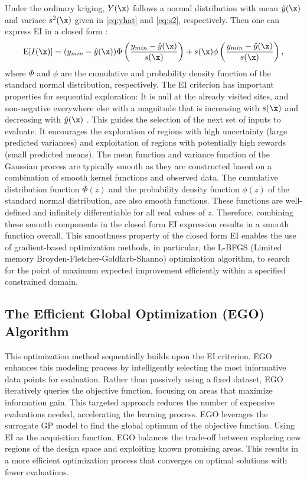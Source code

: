 \documentclass [PhD] {package/uclathes}
\begin{document}
Under the ordinary kriging, $Y(\x)$ follows a normal distribution with mean $\hat y(\x)$ and variace $s^2(\x)$ given in \eqref{eq:yhat} and \eqref{eq:s2}, respectively.
Then one can express EI in a closed form \parencite{jones1998efficient}:
$$
\mathrm{E}[I(\x)] =(y_{min} -\hat y(\x)) \Phi\left(\frac{y_{min}-\hat y(\x)}{s(\x)}\right)+s(\x) \phi\left(\frac{y_{min}-\hat y(\x)}{s(\x)}\right),
$$
where $\Phi$ and $\phi$ are the cumulative and probability density function of the standard normal distribution, respectively.
The EI criterion has important properties for sequential exploration: It is null at the already visited sites, and non-negative everywhere else with a magnitude that is increasing with $s(\x)$ and decreasing with $\hat y(\x)$ \parencite{jones1998efficient}. This guides the selection of the next set of inputs to evaluate. It encourages the exploration of regions with high uncertainty (large predicted variances) and  exploitation of regions with potentially high rewards (small predicted means).
 The mean function and variance function of the Gaussian process are typically smooth as they are constructed based on a combination of smooth kernel functions and observed data.
The cumulative distribution function \(\Phi(z)\) and the probability density function \(\phi(z)\) of the standard normal distribution, are also smooth functions. These functions are well-defined and infinitely differentiable for all real values of $z$. Therefore, combining these smooth components in the closed form EI expression results in a smooth function overall. This smoothness property of the closed form EI enables the use of gradient-based optimization methods, in particular, the L-BFGS (Limited memory Broyden-Fletcher-Goldfarb-Shanno) optimization algorithm, to search for the point of maximum expected improvement efficiently within a specified constrained domain.


\subsection{The Efficient Global Optimization (EGO) Algorithm}

This optimization method sequentially builds upon the EI criterion. EGO enhances this modeling process by intelligently selecting the most informative data points for evaluation. Rather than passively using a fixed dataset, EGO iteratively queries the objective function, focusing on areas that maximize information gain. This targeted approach reduces the number of expensive evaluations needed, accelerating the learning process. EGO \parencite{jones1998efficient} leverages the surrogate GP model to find the global optimum of the objective function. Using EI as the acquisition function, EGO balances the trade-off between exploring new regions of the design space and exploiting known promising areas. This results in a more efficient optimization process that converges on optimal solutions with fewer evaluations.
\end{document}
